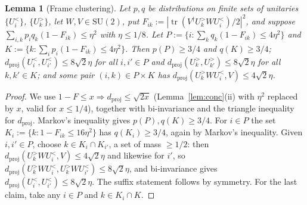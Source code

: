 \documentclass[aps,prx,twocolumn,superscriptaddress,nofootinbib,longbibliography]{revtex4-2}
\theoremstyle{plain}
\newtheorem{lemma}{Lemma}
\theoremstyle{definition}
\theoremstyle{remark}
\newcommand{\dproj}{d_{\mathrm{proj}}}
\newcommand{\SU}{\mathrm{SU}(2)}
\newcommand{\tr}{\operatorname{tr}}
\begin{document}
\begin{lemma}[Frame clustering]\label{lem:cluster}
Let $p,q$ be distributions on finite sets of unitaries $\{U^<_i\}$, $\{U^>_k\}$, let $W,V\in\SU$, put $F_{ik}:=|\tr(V^\dagger U^>_kWU^<_i)/2|^2$, and suppose $\sum_{i,k}p_iq_k(1-F_{ik})\le\eta^2$ with $\eta\le1/8$. Let $P:=\{i:\sum_kq_k(1-F_{ik})\le4\eta^2\}$ and $K:=\{k:\sum_ip_i(1-F_{ik})\le4\eta^2\}$. Then $p(P)\ge3/4$ and $q(K)\ge3/4$; $\dproj(U^<_i,U^<_{i'})\le8\sqrt2\eta$ for all $i,i'\in P$ and $\dproj(U^>_k,U^>_{k'})\le8\sqrt2\eta$ for all $k,k'\in K$; and some pair $(i,k)\in P\times K$ has $\dproj(U^>_kWU^<_i,V)\le4\sqrt2\eta$.
\end{lemma}
\begin{proof}
We use $1-F\le x\Rightarrow\dproj\le\sqrt{2x}$ (Lemma~\ref{lem:conc}(ii) with $\eta^2$ replaced by $x$, valid for $x\le1/4$), together with bi-invariance and the triangle inequality for $\dproj$. Markov's inequality gives $p(P),q(K)\ge3/4$. For $i\in P$ the set $K_i:=\{k:1-F_{ik}\le16\eta^2\}$ has $q(K_i)\ge3/4$, again by Markov's inequality. Given $i,i'\in P$, choose $k\in K_i\cap K_{i'}$, a set of mass $\ge1/2$: then $\dproj(U^>_kWU^<_i,V)\le4\sqrt2\eta$ and likewise for $i'$, so $\dproj(U^>_kWU^<_i,U^>_kWU^<_{i'})\le8\sqrt2\eta$, and bi-invariance gives $\dproj(U^<_i,U^<_{i'})\le8\sqrt2\eta$. The suffix statement follows by symmetry. For the last claim, take any $i\in P$ and $k\in K_i\cap K$.
\end{proof}
\end{document}
